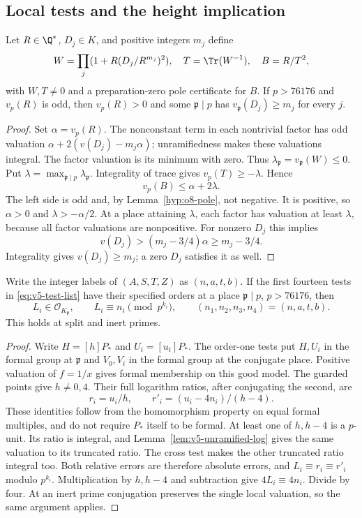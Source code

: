 \subsection{Local tests and the height implication}
\label{subsec:v5-soundness}

\begin{lemma}\label{lem:v5-one-place}
Let $R\in\Q^*$, $D_j\in K$, and positive integers $m_j$ define
\[
 W=\prod_j(1+R(D_j/R^{m_j})^2),\quad
 T=\Tr(W^{-1}),\quad B=R/T^2,
\]
with $W,T\ne0$ and a preparation-zero pole certificate for $B$.
If $p>76176$ and $v_p(R)$ is odd, then $v_p(R)>0$ and some
$\mathfrak p\mid p$ has $v_{\mathfrak p}(D_j)\ge m_j$ for every $j$.
\end{lemma}
\begin{proof}
Set $\alpha=v_p(R)$. The nonconstant term in each nontrivial factor
has odd valuation $\alpha+2(v(D_j)-m_j\alpha)$; unramifiedness
makes these valuations integral. The factor valuation is its minimum
with zero. Thus $\lambda_{\mathfrak p}=v_{\mathfrak p}(W)\le0$.
Put $\lambda=\max_{\mathfrak p\mid p}\lambda_{\mathfrak p}$.
Integrality of trace gives $v_p(T)\ge-\lambda$. Hence
\[
 v_p(B)\le\alpha+2\lambda.
\]
The left side is odd and, by Lemma~\ref{hyp:o8-pole}, not negative.
It is positive, so $\alpha>0$ and $\lambda>-\alpha/2$.
At a place attaining $\lambda$, each factor has valuation at least
$\lambda$, because all factor valuations are nonpositive. For
nonzero $D_j$ this implies
\[
 v(D_j)>(m_j-3/4)\alpha\ge m_j-3/4.
\]
Integrality gives $v(D_j)\ge m_j$; a zero $D_j$ satisfies it as well.
\end{proof}

\begin{lemma}\label{lem:v5-two-anchors}
Write the integer labels of $(A,S,T,Z)$ as $(n,a,t,b)$.
If the first fourteen tests in \eqref{eq:v5-test-list} have their
specified orders at a place $\mathfrak p\mid p$, $p>76176$, then
\[
 L_i\in\mathcal O_{K_{\mathfrak p}},\qquad
 L_i\equiv n_i\pmod{p^{k_i}},\qquad
 (n_1,n_2,n_3,n_4)=(n,a,t,b).
\]
This holds at split and inert primes.
\end{lemma}
\begin{proof}
Write $H=[h]P_*$ and $U_i=[u_i]P_*$. The order-one tests put
$H,U_i$ in the formal group at $\mathfrak p$ and $V_0,V_i$ in the
formal group at the conjugate place. Positive valuation of $f=1/x$
gives formal membership on this good model. The guarded points give
$h\ne0,4$. Their full logarithm ratios, after conjugating the second,
are
\[
 r_i=u_i/h,\qquad r'_i=(u_i-4n_i)/(h-4).
\]
These identities follow from the homomorphism property on equal
formal multiples, and do not require $P_*$ itself to be formal.
At least one of $h,h-4$ is a $p$-unit. Its ratio is integral, and
Lemma~\ref{lem:v5-unramified-log} gives the same valuation to its
truncated ratio. The cross test makes the other truncated ratio
integral too. Both relative errors are therefore absolute errors,
and $L_i\equiv r_i\equiv r'_i$ modulo $p^{k_i}$. Multiplication
by $h,h-4$ and subtraction give $4L_i\equiv4n_i$. Divide by four.
At an inert prime conjugation preserves the single local valuation,
so the same argument applies.
\end{proof}

